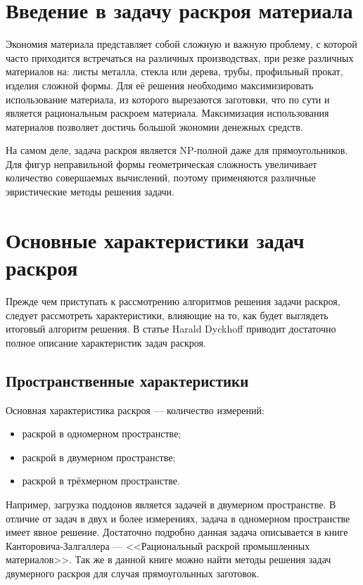 \documentclass[14pt]{extarticle}
\begin{document}
	\section{Введение в задачу раскроя материала}
	Экономия материала представляет собой сложную и важную проблему, с которой
	часто приходится встречаться на различных производствах, при резке различных материалов на: листы металла, стекла или дерева, трубы, профильный прокат, изделия сложной формы. Для её решения необходимо максимизировать использование материала, из которого вырезаются заготовки, что по сути и является рациональным раскроем материала. Максимизация использования материалов позволяет достичь большой экономии денежных средств.
	
	
	На самом деле, задача раскроя является NP-полной даже для прямоугольников. Для
	фигур неправильной формы геометрическая сложность увеличивает количество совершаемых вычислений, поэтому применяются различные эвристические методы решения задачи.
	\section{Основные характеристики задач раскроя}
	Прежде чем приступать к рассмотрению алгоритмов решения задачи раскроя, следует рассмотреть характеристики, влияющие на то, как будет выглядеть итоговый алгоритм решения. В статье \cite{Dyckhoff} Harald Dyckhoff приводит достаточно полное описание характеристик задач раскроя.
	\subsection{Пространственные характеристики}
	Основная характеристика раскроя --- количество измерений:
	\begin{itemize}
		\item раскрой в одномерном пространстве;
		\item раскрой в двумерном пространстве;
		\item раскрой в трёхмерном пространстве.
	\end{itemize}


	Например, загрузка поддонов является задачей в двумерном пространстве. В отличие от 	задач в двух и более измерениях, задача в одномерном пространстве имеет явное решение. Достаточно подробно данная задача описывается в книге \cite{Cantorovich} Канторовича-Залгаллера --- <<Рациональный раскрой промышленных материалов>>. Так же в данной книге можно найти методы решения задач двумерного раскроя для случая прямоугольнных заготовок.
\end{document}
